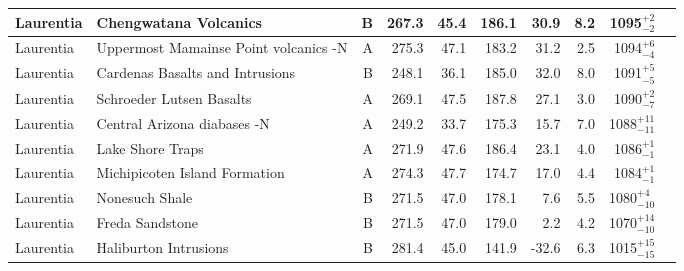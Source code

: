 \begin{longtable}{p{1 in}p{1 in}rrrrrrrp{1.5 in}}
                     Laurentia &                            Chengwatana Volcanics &      B &     267.3 &      45.4 & 186.1 &  30.9 &       8.2 &     1095$^{+2}_{-2}$ &                                  \cite{Kean1997a} \\ \hline
                     Laurentia &            Uppermost Mamainse Point volcanics -N &      A &     275.3 &      47.1 & 183.2 &  31.2 &       2.5 &     1094$^{+6}_{-4}$ &                         \cite{Swanson-Hysell2014a} \\ \hline
                     Laurentia &                  Cardenas Basalts and Intrusions &      B &     248.1 &      36.1 & 185.0 &  32.0 &       8.0 &     1091$^{+5}_{-5}$ &                                   \cite{Weil2003a} \\ \hline
                     Laurentia &                         Schroeder Lutsen Basalts &      A &     269.1 &      47.5 & 187.8 &  27.1 &       3.0 &     1090$^{+2}_{-7}$ &                              \cite{Fairchild2017a} \\ \hline
                     Laurentia &                      Central Arizona diabases -N &      A &     249.2 &      33.7 & 175.3 &  15.7 &       7.0 &   1088$^{+11}_{-11}$ &                               \cite{Donadini2011b} \\ \hline
                     Laurentia &                                 Lake Shore Traps &      A &     271.9 &      47.6 & 186.4 &  23.1 &       4.0 &     1086$^{+1}_{-1}$ &                                \cite{Kulakov2013a} \\ \hline
                     Laurentia &                    Michipicoten Island Formation &      A &     274.3 &      47.7 & 174.7 &  17.0 &       4.4 &     1084$^{+1}_{-1}$ &                              \cite{Fairchild2017a} \\ \hline
                     Laurentia &                                   Nonesuch Shale &      B &     271.5 &      47.0 & 178.1 &   7.6 &       5.5 &    1080$^{+4}_{-10}$ &                                  \cite{Henry1977a} \\ \hline
                     Laurentia &                                  Freda Sandstone &      B &     271.5 &      47.0 & 179.0 &   2.2 &       4.2 &   1070$^{+14}_{-10}$ &                                  \cite{Henry1977a} \\ \hline
                     Laurentia &                            Haliburton Intrusions &      B &     281.4 &      45.0 & 141.9 & -32.6 &       6.3 &   1015$^{+15}_{-15}$ &                                \cite{Warnock2000a} \\ \hline

\end{longtable}
